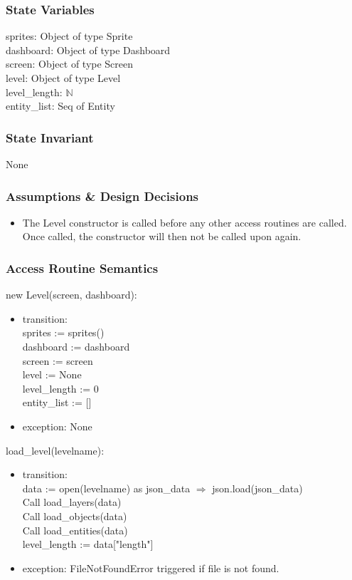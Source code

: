 \documentclass[12pt]{article}
\begin{document}
\subsubsection*{State Variables}
sprites: Object of type Sprite\\
dashboard: Object of type Dashboard\\
screen: Object of type Screen\\
level: Object of type Level\\
level\_length: $\mathbb{N}$\\
entity\_list: Seq of Entity

\subsubsection*{State Invariant}
None
\subsubsection*{Assumptions \& Design Decisions}
\begin{itemize}
    \item The Level constructor is called before any other access routines are called. Once called, the constructor will then not be called upon again.
\end{itemize}

\subsubsection*{Access Routine Semantics}
new Level(screen, dashboard):
\begin{itemize}
    \item transition:\\
    sprites := sprites()\\
    dashboard := dashboard\\
    screen := screen\\
    level := None\\
    level\_length := 0\\
    entity\_list := []\\
    \item exception: None
\end{itemize}

load\_level(levelname):
\begin{itemize}
    \item transition: \\
    data := open(levelname) as json\_data $\Rightarrow$ json.load(json\_data)\\ 
    Call load\_layers(data)\\
    Call load\_objects(data)\\
    Call load\_entities(data)\\
    level\_length := data["length"]
    \item exception: FileNotFoundError triggered if file is not found.
\end{itemize}
\end{document}
